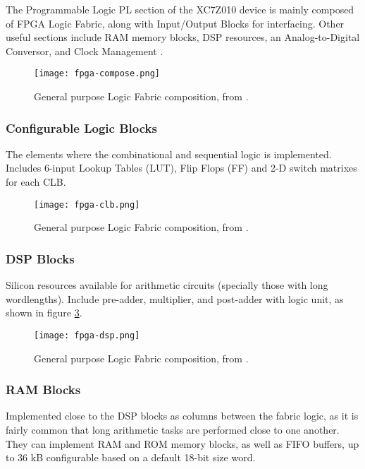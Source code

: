 The Programmable Logic PL section of the XC7Z010 device is mainly composed of FPGA Logic Fabric, along with Input/Output Blocks for interfacing. Other useful sections include RAM memory blocks, DSP resources, an Analog-to-Digital Conversor, and Clock Management \cite[p.~23]{Crokett2014}.

\begin{figure}[htp]
	\centering
	\texttt{[image: fpga-compose.png]}
	\caption{General purpose Logic Fabric composition, from \cite{Crokett2014}.} \label{fig:fpga-compose}
\end{figure}

\subsubsection{Configurable Logic Blocks}

The elements where the combinational and sequential logic is implemented. Includes 6-input Lookup Tables (LUT), Flip Flops (FF) and 2-D switch matrixes for each CLB.

\begin{figure}[htp]
	\centering
	\texttt{[image: fpga-clb.png]}
	\caption{General purpose Logic Fabric composition, from \cite{Crokett2014}.} \label{fig:fpga-clb}
\end{figure}

\subsubsection{DSP Blocks}

Silicon resources available for arithmetic circuits (specially those with long wordlengths). Include pre-adder, multiplier, and post-adder with logic unit, as shown in figure \ref{fig:fpga-dsp}.

\begin{figure}[htp]
	\centering
	\texttt{[image: fpga-dsp.png]}
	\caption{General purpose Logic Fabric composition, from \cite{Crokett2014}.} \label{fig:fpga-dsp}
\end{figure}

\subsubsection{RAM Blocks}

Implemented close to the DSP blocks as columns between the fabric logic, as it is fairly common that long arithmetic tasks are performed close to one another. They can implement RAM and ROM memory blocks, as well as FIFO buffers, up to 36 kB configurable based on a default 18-bit size word.

